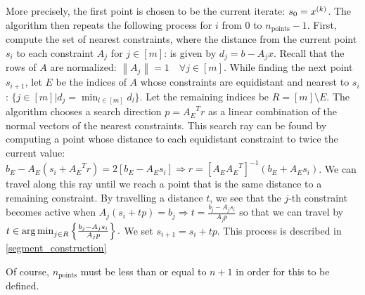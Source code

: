 More precisely, the first point is chosen to be the current iterate: $s_0 = x^{(k)}$.
The algorithm then repeats the following process for $i$ from $0$ to $n_{\text{points}}-1$.
First, compute the set of nearest constraints, where the distance from the current point $s_i$ to each constraint $A_j$ for $j \in [m]$: 
is given by $d_j = b - A_j x$.
Recall that the rows of $A$ are normalized: $\left\|A_j\right\| = 1 \quad \forall j \in [m]$.
While finding the next point $s_{i+1}$, let  $E$ be the indices of $A$ whose constraints are equidistant and nearest to $s_i$:
$\{j \in [m] | d_j = \min_{l \in [m]} d_l\}$.
Let the remaining indices be $R = [m] \setminus E$.
The algorithm chooses a search direction $p = {A_E}^Tr$ as a linear combination of the normal vectors of the nearest constraints.
This search ray can be found by computing a point whose distance to each equidistant constraint to twice the current value:
$ b_E - A_E(s_i + {A_E}^Tr) = 2 \left[b_E - A_Es_i\right] \Longrightarrow r = \left[A_E{A_E}^T\right]^{-1}\left(b_E + A_E s_i\right)$.
We can travel along this ray until we reach a point that is the same distance to a remaining constraint.
By travelling a distance $t$, we see that the $j$-th constraint becomes active when
$A_j (s_i + t p) = b_j \Longrightarrow t = \frac{b_j - A_j s_i}{A_jp}$
so that we can travel by 
$t \in \operatorname*{arg\,min}_{j \in R} \left\{\frac{b_j - A_j s_i}{A_jp}  \right\}. $
We set $s_{i+1} = s_{i} + t p$.
This process is described in \cref{segment_construction}

Of course, $n_{\text{points}}$ must be less than or equal to $n + 1$ in order for this to be defined.

